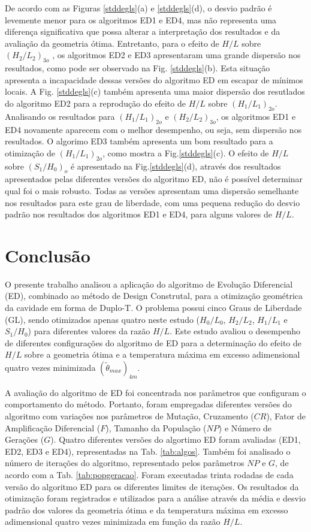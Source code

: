 \documentclass[12pt,A4,A4pt]{article}
\begin{document}
 De acordo com as Figuras \ref{stddegls}(a) e \ref{stddegls}(d), o desvio padrão é levemente menor para os algoritmos ED1 e ED4, mas não representa uma diferença significativa que possa alterar a interpretação dos resultados e da avaliação da geometria ótima. Entretanto, para o efeito de $H/L$ sobre ${(H_{2}/L_{2})_{3o}}$	, os algoritmos ED2 e ED3 apresentaram uma grande dispersão nos resultados, como pode ser observado na Fig. \ref{stddegls}(b). Esta situação apresenta a incapacidade dessas versões do algoritmo ED em escapar de mínimos locais.  A Fig. \ref{stddegls}(c) também apresenta uma maior dispersão dos resutlados do algoritmo ED2 para a reprodução do efeito de $H/L$ sobre ${(H_{1}/L_{1})_{2o}}$. Analisando os resultados para  ${(H_{1}/L_{1})_{2o}}$ e ${(H_{2}/L_{2})_{3o}}$, os algoritmos ED1 e ED4 novamente aparecem com o melhor desempenho, ou seja, sem dispersão nos resultados. O algorimo ED3 também apresenta um bom resultado para a otimização de ${(H_{1}/L_{1})_{2o}}$, como mostra a Fig.\ref{stddegls}(c). O efeito de $H/L$ sobre ${(S_{1}/H_{0})_{o}}$ é apresentado na Fig.\ref{stddegls}(d), através dos resultados apresentados pelas diferentes versões do algoritmo ED, não é possível determinar qual foi o mais robusto. Todas as versões apresentam uma dispersão semelhante nos resultados para este grau de liberdade, com uma pequena redução do desvio padrão nos resultados dos algoritmos ED1 e ED4, para alguns valores de $H/L$.


\section{Conclusão}
\label{con}
\hspace{0.5cm} O presente trabalho analisou a aplicação do algoritmo de Evolução Diferencial (ED), combinado ao método de Design Construtal, para a otimização geométrica da cavidade em forma de Duplo-T. O problema possui cinco Graus de Liberdade (GL), sendo otimizados apenas quatro neste estudo ($H_{0}/L_{0}$,  $H_{2}/L_{2}$, $H_{1}/L_{1}$ e $S_{1}/H_{0}$) para diferentes valores da razão $H/L$. Este estudo avaliou o desempenho de diferentes configurações do algoritmo de ED para a determinação do efeito de $H/L$ sobre a geometria ótima e a temperatura máxima em excesso adimensional quatro vezes minimizada  $({\tilde{\theta}}_{max})_{4m}$.

A avaliação do algoritmo de ED foi concentrada nos parâmetros que configuram o comportamento do método. Portanto, foram empregadas diferentes versões do algoritmo com variações nos parâmetros de Mutação, Cruzamento ($CR$), Fator de Amplificação Diferencial ($F$), Tamanho da População ($NP$) e Número de Gerações ($G$). Quatro diferentes versões do algortimo ED foram avaliadas (ED1, ED2, ED3 e ED4), representadas na Tab. \ref{tab:algos}. Também foi analisado o número de iterações do algoritmo, representado pelos parâmetros $NP$ e $G$, de acordo com a Tab. \ref{tab:popgeracao}. Foram executadas trinta rodadas de cada versão do algoritmo ED para os diferentes limites de iterações. Os resultados da otimização foram registrados e utilizados para a análise através da média e desvio padrão dos valores da geometria ótima e da temperatura máxima em excesso adimensional quatro vezes minimizada em função da razão $H/L$.
\end{document}
